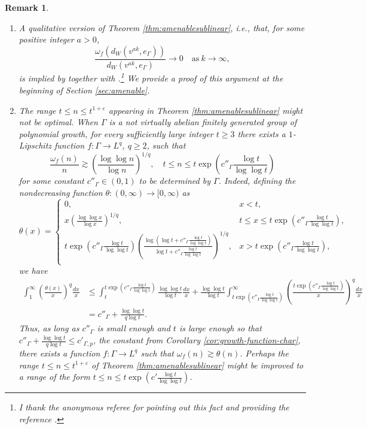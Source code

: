 \documentclass[11pt,reqno]{amsart}
\newtheorem{remark}[theorem]{Remark}
\newcommand{\1}{\mathbf 1}
\begin{document}
\begin{remark}\label{rem:qualitativesublinear}\,
\begin{enumerate}
    \item A qualitative version of Theorem \ref{thm:amenablesublinear}, i.e., that, for some positive integer $a>0$,
    \[
    \frac{\omega_f\left(d_W\left(v^{ak},e_\Gamma\right)\right)}{d_W\left(v^{ak},e_\Gamma\right)}\to 0\quad \mathrm{as}~k\to\infty,
    \]
    is implied by \cite[Proposition 3.5]{das2016integrable} together with \cite[Theorem 9.1]{naor2011lp}.\footnote{I thank the anonymous referee for pointing out this fact and providing the reference \cite{das2016integrable}.} We provide a proof of this argument at the beginning of Section \ref{sec:amenable}.
    \item The range $t\le n\le t^{1+\varepsilon}$ appearing in Theorem \ref{thm:amenablesublinear} might not be optimal. When $\Gamma$ is a not virtually abelian finitely generated group of polynomial growth, for every sufficiently large integer $t\ge 3$ there exists a $1$-Lipschitz function $f:\Gamma\to L^q$, $q\ge 2$, such that
    \[
\frac{\omega_f\left(n\right)}{n}\gtrsim \left(\frac{\log \log n}{\log n}\right)^{1/q},\quad t\le n\le t\exp\left(c''_\Gamma \frac{\log t}{\log\log t}\right)
\]
for some constant $c''_\Gamma\in (0,1)$ to be determined by $\Gamma$. Indeed, defining the nondecreasing function $\theta:(0,\infty)\to [0,\infty)$ as
\[
\theta\left(x\right)=
\begin{cases}
    0,&x<t,\\
    x\left(\frac{\log \log x}{\log x}\right)^{1/q},&t\le x\le t\exp\left(c''_\Gamma \frac{\log t}{\log\log t}\right),\\
    t\exp\left(c''_\Gamma \frac{\log t}{\log\log t}\right)\left(\frac{\log \left(\log t+c''_\Gamma \frac{\log t}{\log\log t}\right)}{\log t+c''_\Gamma \frac{\log t}{\log\log t}}\right)^{1/q},&x> t\exp\left(c''_\Gamma \frac{\log t}{\log\log t}\right),\\
\end{cases}
\]
we have
\begin{align*}
\int_1^{\infty} \left(\frac{\theta\left(x\right)}{x}\right)^{q}\frac{dx}{x}&\le\int_t^{t\exp\left(c''_\Gamma \frac{\log t}{\log\log t}\right)}\frac{\log\log t}{\log t}\frac{dx}{x}+\frac{\log\log t}{\log t}\int_{t\exp\left(c''_\Gamma \frac{\log t}{\log\log t}\right)}^\infty\left(\frac{t\exp\left(c''_\Gamma \frac{\log t}{\log\log t}\right)}{x}\right)^q\frac{dx}{x}\\
&=c''_\Gamma+\frac{\log\log t}{q\log t}.
\end{align*}
Thus, as long as $c''_\Gamma$ is small enough and $t$ is large enough so that $c''_\Gamma+\frac{\log\log t}{q\log t}\le c'_{\Gamma,p}$, the constant from Corollary \ref{cor:growth-function-char}, there exists a function $f:\Gamma\to L^q$ such that $\omega_f(n)\gtrsim \theta(n)$. Perhaps the range $t\le n\le t^{1+\varepsilon}$ of Theorem \ref{thm:amenablesublinear} might be improved to a range of the form $t\le n\le t\exp\left(c'\frac{\log t}{\log\log t}\right)$.


\end{enumerate}
\end{remark}
\end{document}

